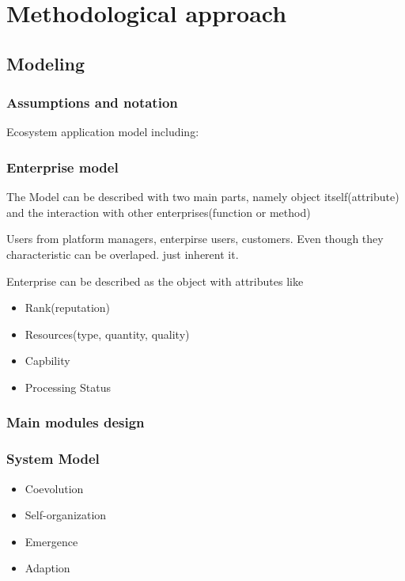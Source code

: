 \section{Methodological approach} %
\label{sec:methodological_approach}

\subsection{Modeling} %
\label{sub:modeling}

\subsubsection{Assumptions and notation}

Ecosystem application model including:
\subsubsection{Enterprise model}

The Model can be described with two main parts, namely object itself(attribute) and the interaction with other enterprises(function or method)

Users from platform managers, enterpirse users, customers. Even though they characteristic can be overlaped. just inherent it.

Enterprise can be described as the object with attributes like 
\begin{itemize}
	\item Rank(reputation)
	\item Resources(type, quantity, quality)
	\item Capbility
	\item Processing Status
\end{itemize}

\subsubsection{Main modules design}
\label{subsub:main_modules}


\subsubsection{System Model}
\begin{itemize}
	\item Coevolution
	\item Self-organization
	\item Emergence	
	\item Adaption
\end{itemize}

